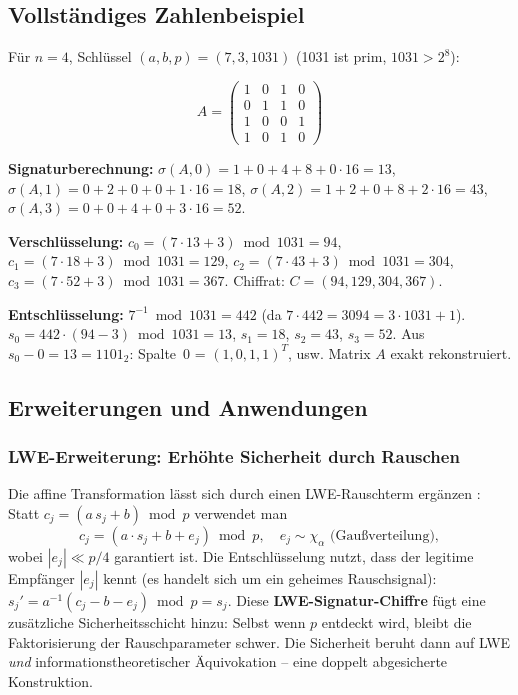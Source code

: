 ﻿\documentclass[a4paper,12pt]{article}
\theoremstyle{definition}
\begin{document}
\subsection{Vollständiges Zahlenbeispiel}

Für $n = 4$, Schlüssel $(a, b, p) = (7, 3, 1031)$ (1031 ist prim, $1031 > 2^8$):

\[
A = \begin{pmatrix} 1 & 0 & 1 & 0 \\ 0 & 1 & 1 & 0 \\ 1 & 0 & 0 & 1 \\ 1 & 0 & 1 & 0 \end{pmatrix}
\]

\textbf{Signaturberechnung:}
$\sigma(A,0) = 1 + 0 + 4 + 8 + 0\cdot16 = 13$,\;
$\sigma(A,1) = 0 + 2 + 0 + 0 + 1\cdot16 = 18$,\;
$\sigma(A,2) = 1 + 2 + 0 + 8 + 2\cdot16 = 43$,\;
$\sigma(A,3) = 0 + 0 + 4 + 0 + 3\cdot16 = 52$.

\textbf{Verschlüsselung:}
$c_0 = (7\cdot13+3)\bmod 1031 = 94$,\;
$c_1 = (7\cdot18+3)\bmod 1031 = 129$,\;
$c_2 = (7\cdot43+3)\bmod 1031 = 304$,\;
$c_3 = (7\cdot52+3)\bmod 1031 = 367$.
Chiffrat: $C = (94, 129, 304, 367)$.

\textbf{Entschlüsselung:}
$7^{-1} \bmod 1031 = 442$ (da $7 \cdot 442 = 3094 = 3 \cdot 1031 + 1$).
$s_0 = 442\cdot(94-3)\bmod 1031 = 13$,\;
$s_1 = 18$,\;
$s_2 = 43$,\;
$s_3 = 52$.
Aus $s_0 - 0 = 13 = 1101_2$: Spalte~0 = $(1,0,1,1)^T$, usw. Matrix $A$ exakt rekonstruiert.

\subsection{Erweiterungen und Anwendungen}

\subsubsection{LWE-Erweiterung: Erhöhte Sicherheit durch Rauschen}

Die affine Transformation lässt sich durch einen LWE-Rauschterm ergänzen
\cite{Epp26b}: Statt $c_j = (a\,s_j + b)\bmod p$ verwendet man
\[
  c_j = (a \cdot s_j + b + e_j) \bmod p, \quad e_j \sim \chi_\alpha \text{ (Gaußverteilung)},
\]
wobei $|e_j| \ll p/4$ garantiert ist. Die Entschlüsselung nutzt, dass der legitime
Empfänger $|e_j|$ kennt (es handelt sich um ein geheimes Rauschsignal):
$s_j' = a^{-1}(c_j - b - e_j) \bmod p = s_j$.
Diese \textbf{LWE-Signatur-Chiffre} fügt eine zusätzliche Sicherheitsschicht
hinzu: Selbst wenn $p$ entdeckt wird, bleibt die Faktorisierung der Rauschparameter
schwer. Die Sicherheit beruht dann auf LWE \emph{und} informationstheoretischer
Äquivokation -- eine doppelt abgesicherte Konstruktion.
\end{document}
